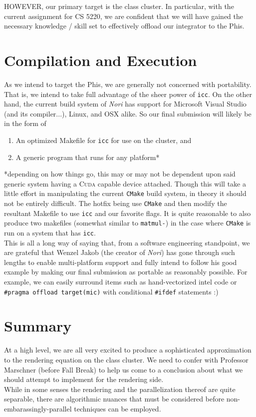\documentclass[11pt]{article}
\begin{document}
HOWEVER, our primary target is the class cluster.  In particular, with the current assignment for CS 5220, we are confident that we will have gained the necessary knowledge / skill set to effectively offload our integrator to the Phis.

\section{Compilation and Execution}

As we intend to target the Phis, we are generally not concerned with portability.  That is, we intend to take full advantage of the sheer power of \texttt{icc}.  On the other hand, the current build system of \emph{Nori} has support for Microsoft Visual Studio (and its compiler...), Linux, and OSX alike.  So our final submission will likely be in the form of

\begin{enumerate}[1.]
    \item An optimized Makefile for \texttt{icc} for use on the cluster, and
    \item A generic program that runs for any platform*
\end{enumerate}

*depending on how things go, this may or may not be dependent upon said generic system having a \textsc{Cuda} capable device attached.  Though this will take a little effort in manipulating the current \texttt{CMake} build system, in theory it should not be entirely difficult.  The hotfix being use \texttt{CMake} and then modify the resultant Makefile to use \texttt{icc} and our favorite flags.  It is quite reasonable to also produce two makefiles (somewhat similar to \texttt{matmul-}) in the case where \texttt{CMake} is run on a system that has \texttt{icc}.\\

This is all a long way of saying that, from a software engineering standpoint, we are grateful that Wenzel Jakob (the creator of \emph{Nori}) has gone through such lengths to enable multi-platform support and fully intend to follow his good example by making our final submission as portable as reasonably possible.  For example, we can easily surround items such as hand-vectorized intel code or \texttt{\#pragma offload target(mic)} with conditional \texttt{\#ifdef} statements :)

\section{Summary}

At a high level, we are all very excited to produce a sophisticated approximation to the rendering equation on the class cluster.  We need to confer with Professor Marschner (before Fall Break) to help us come to a conclusion about what we should attempt to implement for the rendering side.\\

While in some senses the rendering and the parallelization thereof are quite separable, there are algorithmic nuances that must be considered before non-embarassingly-parallel techniques can be employed.
\end{document}
